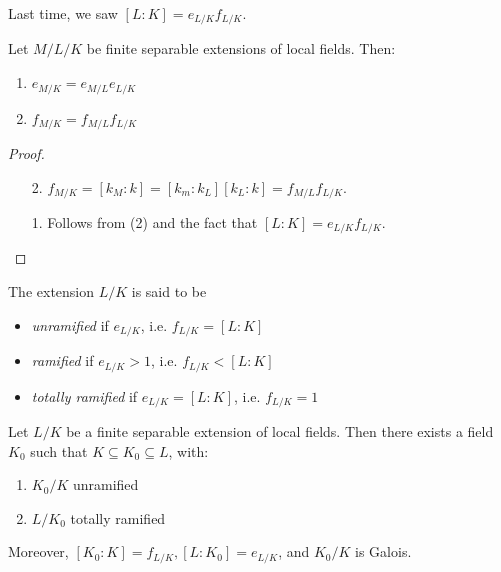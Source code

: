 \documentclass[10pt,a4paper]{article}
\begin{document}
Last time, we saw $[L:K] = e_{L/K}f_{L/K}$.
\begin{lemma}
  Let $M/L/K$ be finite separable extensions of local fields. Then:
  \begin{enumerate}
    \item $e_{M/K} = e_{M/L}e_{L/K}$
    \item $f_{M/K} = f_{M/L}f_{L/K}$
  \end{enumerate}
\end{lemma}
\begin{proof}\hspace*{0cm}
  \begin{enumerate}
    \item[2.] $f_{M/K} = [k_M:k] = [k_m:k_L][k_L:k] = f_{M/L}f_{L/K}$.
    \item[1.] Follows from (2) and the fact that $[L:K] = e_{L/K}f_{L/K}$.
  \end{enumerate}
\end{proof}
\begin{definition}
  The extension $L/K$ is said to be
  \begin{itemize}
    \item \emph{unramified} if $e_{L/K}$, i.e. $f_{L/K} = [L:K]$
    \item \emph{ramified} if $e_{L/K} > 1$, i.e. $f_{L/K} < [L:K]$
    \item \emph{totally ramified} if $e_{L/K} = [L:K]$, i.e. $f_{L/K} = 1$
  \end{itemize}
\end{definition}
\begin{theorem}
  Let $L/K$ be a finite separable extension of local fields. Then there exists a field $K_0$ such that $K \subseteq K_0 \subseteq L$, with:
  \begin{enumerate}
    \item $K_0/K$ unramified
    \item $L/K_0$ totally ramified
  \end{enumerate}
  Moreover, $[K_0:K] = f_{L/K}, [L:K_0] = e_{L/K}$, and $K_0/K$ is Galois.
\end{theorem}
\end{document}
